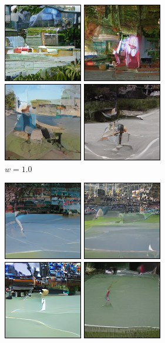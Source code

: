 \documentclass[11pt,a4paper]{article}
\begin{document}
    \begin{figure}[!ht]
        \centering
        \begin{subfigure}[b]{0.24\textwidth}
        \includegraphics[width=\linewidth]{figures/A_tennis_court_1.png}
        \caption{$w=1.0$}
        \end{subfigure}
        \begin{subfigure}[b]{0.24\textwidth}
        \includegraphics[width=\linewidth]{figures/A_tennis_court_3.png}

\end{subfigure}
\end{figure}
\end{document}
